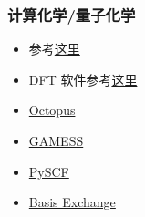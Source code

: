 \subsubsection{计算化学/量子化学}
\begin{itemize}
\item 参考\href{https://en.wikipedia.org/wiki/Category:Computational_chemistry_software}{这里}
\item DFT 软件参考\href{https://en.wikipedia.org/wiki/Category:Density_functional_theory_software}{这里}
\item \href{https://octopus-code.org/documentation/14/}{Octopus}
\item \href{https://www.msg.chem.iastate.edu/gamess/}{GAMESS}
\item \href{https://pyscf.org/}{PySCF}
\item \href{https://www.basissetexchange.org/}{Basis Exchange}
\end{itemize}
